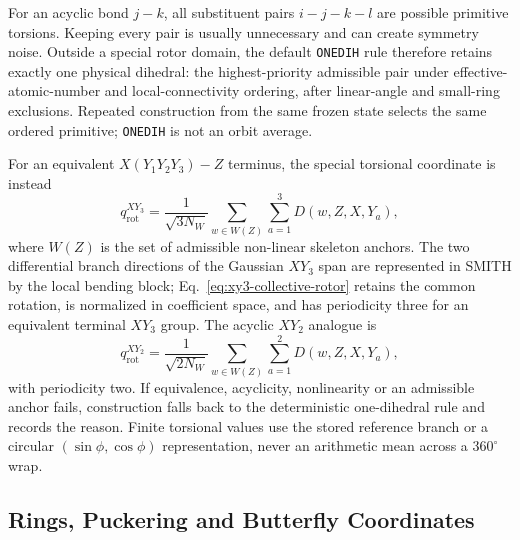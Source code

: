 \documentclass[journal=jctcce,manuscript=article,layout=traditional]{achemso}
\theoremstyle{definition}
\begin{document}
{\color{red}
For an acyclic bond \(j-k\), all substituent pairs \(i-j-k-l\) are possible
primitive torsions.  Keeping every pair is usually unnecessary and can create
symmetry noise.  Outside a special rotor domain, the default \texttt{ONEDIH}
rule therefore retains exactly one physical dihedral: the highest-priority
admissible pair under effective-atomic-number and local-connectivity ordering,
after linear-angle and small-ring exclusions.  Repeated construction from the
same frozen state selects the same ordered primitive; \texttt{ONEDIH} is not an
orbit average.

For an equivalent \(X(Y_1Y_2Y_3)-Z\) terminus, the special torsional coordinate
is instead
\begin{equation}
 q_{\mathrm{rot}}^{XY_3}
 = \frac{1}{\sqrt{3N_W}}
   \sum_{w\in W(Z)}\sum_{a=1}^{3} D(w,Z,X,Y_a),
 \label{eq:xy3-collective-rotor}
\end{equation}
where \(W(Z)\) is the set of admissible non-linear skeleton anchors.  The two
differential branch directions of the Gaussian \(XY_3\) span are represented
in SMITH by the local bending block; Eq.~\ref{eq:xy3-collective-rotor} retains
the common rotation, is normalized in coefficient space, and has periodicity
three for an equivalent terminal \(XY_3\) group.  The acyclic \(XY_2\)
analogue is
\begin{equation}
 q_{\mathrm{rot}}^{XY_2}
 = \frac{1}{\sqrt{2N_W}}
   \sum_{w\in W(Z)}\sum_{a=1}^{2} D(w,Z,X,Y_a),
 \label{eq:xy2-collective-rotor}
\end{equation}
with periodicity two.  If equivalence, acyclicity, nonlinearity or an
admissible anchor fails, construction falls back to the deterministic
one-dihedral rule and records the reason.  Finite torsional values use the
stored reference branch or a circular \((\sin\phi,\cos\phi)\) representation,
never an arithmetic mean across a \(360^\circ\) wrap.
}

\subsection{Rings, Puckering and Butterfly Coordinates}
\end{document}
